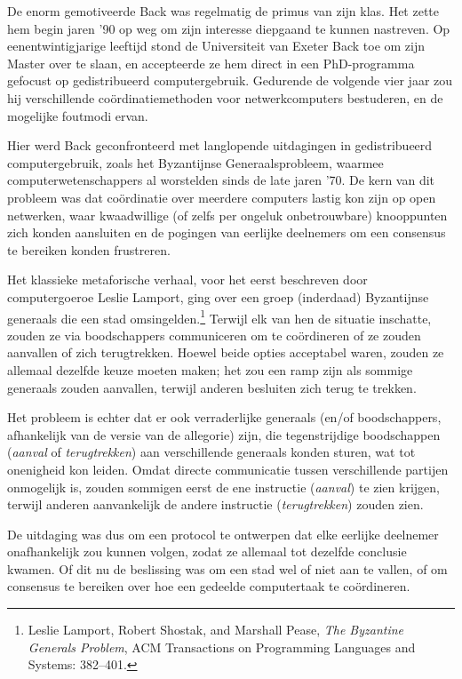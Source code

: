 \documentclass[
  a5paper,
  smalldemyvopaper,11pt,twoside,onecolumn,openright,extrafontsizes,
hidelinks]{memoir}
\begin{document}
De enorm gemotiveerde Back was regelmatig de primus van zijn klas. Het
zette hem begin jaren '90 op weg om zijn interesse diepgaand te kunnen
nastreven. Op eenentwintigjarige leeftijd stond de Universiteit van
Exeter Back toe om zijn Master over te slaan, en accepteerde ze hem
direct in een PhD-programma gefocust op gedistribueerd computergebruik.
Gedurende de volgende vier jaar zou hij verschillende
coördinatiemethoden voor netwerkcomputers bestuderen, en de mogelijke
foutmodi ervan.

Hier werd Back geconfronteerd met langlopende uitdagingen in
gedistribueerd computergebruik, zoals het Byzantijnse Generaalsprobleem,
waarmee computerwetenschappers al worstelden sinds de late jaren '70. De
kern van dit probleem was dat coördinatie over meerdere computers lastig
kon zijn op open netwerken, waar kwaadwillige (of zelfs per ongeluk
onbetrouwbare) knooppunten zich konden aansluiten en de pogingen van
eerlijke deelnemers om een consensus te bereiken konden frustreren.

Het klassieke metaforische verhaal, voor het eerst beschreven door
computergoeroe Leslie Lamport, ging over een groep (inderdaad)
Byzantijnse generaals die een stad omsingelden.\footnote{Leslie Lamport,
  Robert Shostak, and Marshall Pease, \emph{The Byzantine Generals
  Problem}, ACM Transactions on Programming Languages and Systems:
  382--401.} Terwijl elk van hen de situatie inschatte, zouden ze via
boodschappers communiceren om te coördineren of ze zouden aanvallen of
zich terugtrekken. Hoewel beide opties acceptabel waren, zouden ze
allemaal dezelfde keuze moeten maken; het zou een ramp zijn als sommige
generaals zouden aanvallen, terwijl anderen besluiten zich terug te
trekken.

Het probleem is echter dat er ook verraderlijke generaals (en/of
boodschappers, afhankelijk van de versie van de allegorie) zijn, die
tegenstrijdige boodschappen (\emph{aanval} of \emph{terugtrekken}) aan
verschillende generaals konden sturen, wat tot onenigheid kon leiden.
Omdat directe communicatie tussen verschillende partijen onmogelijk is,
zouden sommigen eerst de ene instructie (\emph{aanval}) te zien krijgen,
terwijl anderen aanvankelijk de andere instructie (\emph{terugtrekken})
zouden zien.

De uitdaging was dus om een protocol te ontwerpen dat elke eerlijke
deelnemer onafhankelijk zou kunnen volgen, zodat ze allemaal tot
dezelfde conclusie kwamen. Of dit nu de beslissing was om een stad wel
of niet aan te vallen, of om consensus te bereiken over hoe een gedeelde
computertaak te coördineren.
\end{document}
